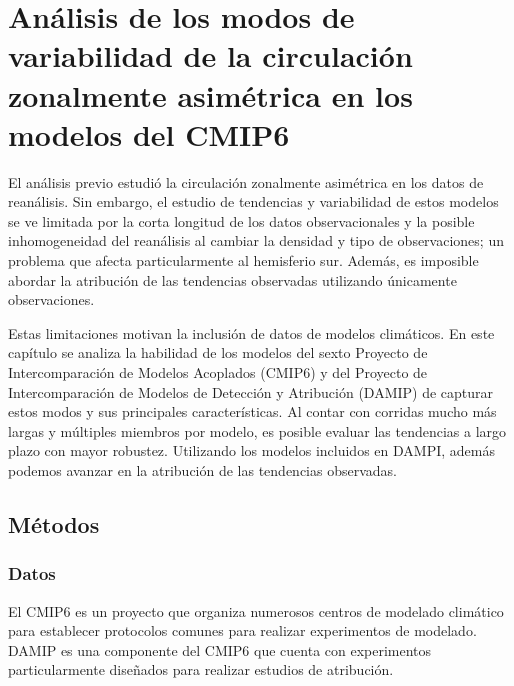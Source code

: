 \documentclass[12pt,oneside,a4paper]{reedthesis}
\begin{document}
\hypertarget{anuxe1lisis-de-los-modos-de-variabilidad-de-la-circulaciuxf3n-zonalmente-asimuxe9trica-en-los-modelos-del-cmip6}{%
\chapter{Análisis de los modos de variabilidad de la circulación zonalmente asimétrica en los modelos del CMIP6}\label{anuxe1lisis-de-los-modos-de-variabilidad-de-la-circulaciuxf3n-zonalmente-asimuxe9trica-en-los-modelos-del-cmip6}}

El análisis previo estudió la circulación zonalmente asimétrica en los datos de reanálisis.
Sin embargo, el estudio de tendencias y variabilidad de estos modelos se ve limitada por la corta longitud de los datos observacionales y la posible inhomogeneidad del reanálisis al cambiar la densidad y tipo de observaciones; un problema que afecta particularmente al hemisferio sur.
Además, es imposible abordar la atribución de las tendencias observadas utilizando únicamente observaciones.

Estas limitaciones motivan la inclusión de datos de modelos climáticos.
En este capítulo se analiza la habilidad de los modelos del sexto Proyecto de Intercomparación de Modelos Acoplados (CMIP6) y del Proyecto de Intercomparación de Modelos de Detección y Atribución (DAMIP) de capturar estos modos y sus principales características.
Al contar con corridas mucho más largas y múltiples miembros por modelo, es posible evaluar las tendencias a largo plazo con mayor robustez.
Utilizando los modelos incluidos en DAMPI, además podemos avanzar en la atribución de las tendencias observadas.

\hypertarget{muxe9todos-3}{%
\section{Métodos}\label{muxe9todos-3}}

\hypertarget{datos-3}{%
\subsection{Datos}\label{datos-3}}

El CMIP6 es un proyecto que organiza numerosos centros de modelado climático para establecer protocolos comunes para realizar experimentos de modelado.
DAMIP es una componente del CMIP6 que cuenta con experimentos particularmente diseñados para realizar estudios de atribución.
\end{document}
